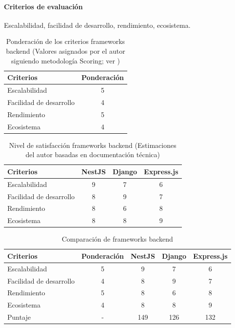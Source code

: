 \paragraph{Criterios de evaluación}
Escalabilidad, facilidad de desarrollo, rendimiento, ecosistema.
\begin{table}[ht]
\centering
\caption{Ponderación de los criterios frameworks backend (Valores asignados por el autor siguiendo metodología Scoring; ver \cite{belton2002})}
\begin{tabular}{l c}
\hline
Criterios & Ponderación \\
\hline
Escalabilidad & 5 \\
Facilidad de desarrollo & 4 \\
Rendimiento & 5 \\
Ecosistema & 4 \\
\hline
\end{tabular}
\end{table}
\FloatBarrier

\begin{table}[ht]
\centering
\caption{Nivel de satisfacción frameworks backend (Estimaciones del autor basadas en documentación técnica)}
\begin{tabular}{l c c c}
\hline
Criterios & NestJS & Django & Express.js \\
\hline
Escalabilidad & 9 & 7 & 6 \\
Facilidad de desarrollo & 8 & 9 & 7 \\
Rendimiento & 8 & 6 & 8 \\
Ecosistema & 8 & 8 & 9 \\
\hline
\end{tabular}
\end{table}
\FloatBarrier

\begin{table}[ht]
\centering
\caption{Comparación de frameworks backend}
\begin{tabular}{l c c c c}
\hline
Criterios & Ponderación & NestJS & Django & Express.js \\
\hline
Escalabilidad & 5 & 9 & 7 & 6 \\
Facilidad de desarrollo & 4 & 8 & 9 & 7 \\
Rendimiento & 5 & 8 & 6 & 8 \\
Ecosistema & 4 & 8 & 8 & 9 \\
\hline
Puntaje & - & 149 & 126 & 132 \\
\hline
\end{tabular}
\end{table}
\FloatBarrier
